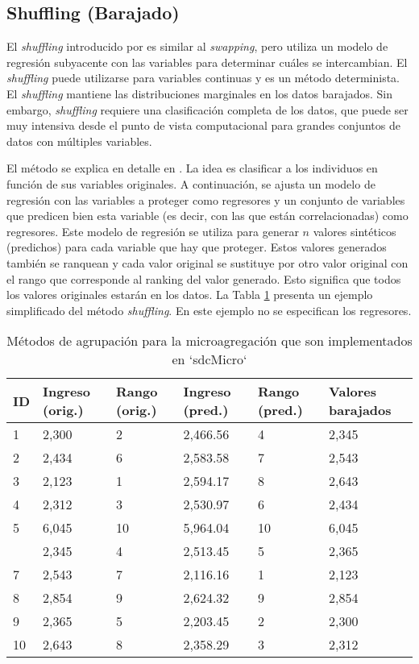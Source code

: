 \documentclass[
]{book}
\theoremstyle{definition}
\theoremstyle{definition}
\theoremstyle{definition}
\theoremstyle{definition}
\theoremstyle{remark}
\begin{document}
\hypertarget{shuffling-barajado}{%
\subsection{Shuffling (Barajado)}\label{shuffling-barajado}}

El \emph{shuffling} introducido por \citep{MuSa06} es similar al \emph{swapping}, pero utiliza un modelo de regresión subyacente con las variables para determinar cuáles se intercambian. El \emph{shuffling} puede utilizarse para variables continuas y es un método determinista. El \emph{shuffling} mantiene las distribuciones marginales en los datos barajados. Sin embargo, \emph{shuffling} requiere una clasificación completa de los datos, que puede ser muy intensiva desde el punto de vista computacional para grandes conjuntos de datos con múltiples variables.

El método se explica en detalle en \citep{MuSa06}. La idea es clasificar a los individuos en función de sus variables originales. A continuación, se ajusta un modelo de regresión con las variables a proteger como regresores y un conjunto de variables que predicen bien esta variable (es decir, con las que están correlacionadas) como regresores. Este modelo de regresión se utiliza para generar \(n\) valores sintéticos (predichos) para cada variable que hay que proteger. Estos valores generados también se ranquean y cada valor original se sustituye por otro valor original con el rango que corresponde al ranking del valor generado. Esto significa que todos los valores originales estarán en los datos. La Tabla \ref{tab:Tabla19} presenta un ejemplo simplificado del método \emph{shuffling}. En este ejemplo no se especifican los regresores.

\begin{table}

\caption{\label{tab:Tabla19}\label{tab:Tabla19}Métodos de agrupación para la microagregación que son implementados en `sdcMicro`}
\centering
\begin{tabular}[t]{llllll}
\toprule
ID & Ingreso (orig.) & Rango (orig.) & Ingreso (pred.) & Rango (pred.) & Valores barajados\\
\midrule
1 & 2,300 & 2 & 2,466.56 & 4 & 2,345\\
2 & 2,434 & 6 & 2,583.58 & 7 & 2,543\\
3 & 2,123 & 1 & 2,594.17 & 8 & 2,643\\
4 & 2,312 & 3 & 2,530.97 & 6 & 2,434\\
5 & 6,045 & 10 & 5,964.04 & 10 & 6,045\\
\addlinespace
6 & 2,345 & 4 & 2,513.45 & 5 & 2,365\\
7 & 2,543 & 7 & 2,116.16 & 1 & 2,123\\
8 & 2,854 & 9 & 2,624.32 & 9 & 2,854\\
9 & 2,365 & 5 & 2,203.45 & 2 & 2,300\\
10 & 2,643 & 8 & 2,358.29 & 3 & 2,312\\
\bottomrule
\end{tabular}
\end{table}
\end{document}
